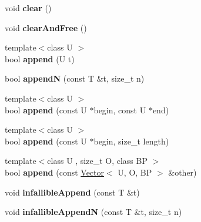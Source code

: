 \begin{DoxyCompactItemize}
\item 
\hypertarget{classjs_1_1_vector_a7736be066f2c716281516a5344d3cfc7}{void {\bfseries clear} ()}\label{classjs_1_1_vector_a7736be066f2c716281516a5344d3cfc7}

\item 
\hypertarget{classjs_1_1_vector_a9dd043059de6dfd18aed5ce60c3f0f6d}{void {\bfseries clear\-And\-Free} ()}\label{classjs_1_1_vector_a9dd043059de6dfd18aed5ce60c3f0f6d}

\item 
\hypertarget{classjs_1_1_vector_a575b79c9783c12b16d854b992746234b}{{\footnotesize template$<$class U $>$ }\\bool {\bfseries append} (U t)}\label{classjs_1_1_vector_a575b79c9783c12b16d854b992746234b}

\item 
\hypertarget{classjs_1_1_vector_a3c0e61afac84cb6430de9e654605c949}{bool {\bfseries append\-N} (const T \&t, size\-\_\-t n)}\label{classjs_1_1_vector_a3c0e61afac84cb6430de9e654605c949}

\item 
\hypertarget{classjs_1_1_vector_ab32e4edfef7beb1b12624a89435966d0}{{\footnotesize template$<$class U $>$ }\\bool {\bfseries append} (const U $\ast$begin, const U $\ast$end)}\label{classjs_1_1_vector_ab32e4edfef7beb1b12624a89435966d0}

\item 
\hypertarget{classjs_1_1_vector_aed8b348be5038015c04ebf9aa644a000}{{\footnotesize template$<$class U $>$ }\\bool {\bfseries append} (const U $\ast$begin, size\-\_\-t length)}\label{classjs_1_1_vector_aed8b348be5038015c04ebf9aa644a000}

\item 
\hypertarget{classjs_1_1_vector_a21f2bb19acb578a96d0467ee9a0a052c}{{\footnotesize template$<$class U , size\-\_\-t O, class B\-P $>$ }\\bool {\bfseries append} (const \hyperlink{classjs_1_1_vector}{Vector}$<$ U, O, B\-P $>$ \&other)}\label{classjs_1_1_vector_a21f2bb19acb578a96d0467ee9a0a052c}

\item 
\hypertarget{classjs_1_1_vector_af90df066edf4db743317ce590b4e9273}{void {\bfseries infallible\-Append} (const T \&t)}\label{classjs_1_1_vector_af90df066edf4db743317ce590b4e9273}

\item 
\hypertarget{classjs_1_1_vector_a7049dead24cebcb64b6a594e3851a771}{void {\bfseries infallible\-Append\-N} (const T \&t, size\-\_\-t n)}\label{classjs_1_1_vector_a7049dead24cebcb64b6a594e3851a771}


\end{DoxyCompactItemize}
